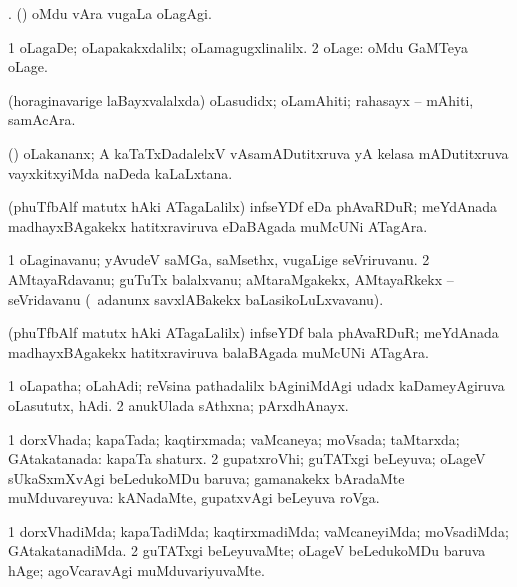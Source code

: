 \noindent
\gl{\pagu}
\bmng
{}. (\AmA) oMdu vAra \mo vugaLa oLagAgi. 
\emng
\eentry

\bentry
{}
\gl{\upa}
\bmng
\bnum
\num{1} oLagaDe; oLapakakxdalilx; oLamagugxlinalilx. 
\num{2} oLage:  oMdu GaMTeya oLage. 
\enum
\emng
\eentry

\bentry
{}
\gl{\nA}
\bmng
(horaginavarige laBayxvalalxda) oLasudidx; oLamAhiti; rahasayx -- mAhiti, samAcAra. 
\emng
\eentry

\bentry
{}
\gl{\nA}
\bmng
(\AmA) oLakananx; A kaTaTxDadalelxV vAsamADutitxruva yA kelasa mADutitxruva vayxkitxyiMda naDeda kaLaLxtana. 
\emng
\eentry

\bentry
{}
\gl{\nA}
\bmng
(phuTfbAlf matutx hAki ATagaLalilx) infseYDf eDa phAvaRDuR; meYdAnada madhayxBAgakekx hatitxraviruva eDaBAgada muMcUNi ATagAra. 
\emng
\eentry

\bentry
{}
\gl{\nA}
\bmng
\bnum
\num{1} oLaginavanu; yAvudeV saMGa, saMsethx, \mo vugaLige seVriruvanu. 
\num{2} AMtayaRdavanu; guTuTx balalxvanu; aMtaraMgakekx, AMtayaRkekx -- seVridavanu (\kanmu\ adanunx savxlABakekx baLasikoLuLxvavanu). 
\enum
\emng
\eentry

\bentry
{}
\gl{\nA}
\bmng
(phuTfbAlf matutx hAki ATagaLalilx) infseYDf bala phAvaRDuR; meYdAnada madhayxBAgakekx hatitxraviruva balaBAgada muMcUNi ATagAra. 
\emng
\eentry

\bentry
{}
\gl{\nA}
\bmng
\bnum
\num{1} oLapatha; oLahAdi; reVsina pathadalilx bAginiMdAgi udadx kaDameyAgiruva oLasututx, hAdi. 
\num{2} anukUlada sAthxna; pArxdhAnayx. 
\enum
\emng
\eentry

\bentry
{}
\gl{\gu}
\bmng
\bnum
\num{1} dorxVhada; kapaTada; kaqtirxmada; vaMcaneya; moVsada; taMtarxda; GAtakatanada:  kapaTa shaturx. 
\num{2} gupatxroVhi; guTATxgi beLeyuva; oLageV sUkaSxmXvAgi beLedukoMDu baruva; gamanakekx bAradaMte muMduvareyuva:  kANadaMte, gupatxvAgi beLeyuva roVga. 
\enum
\emng
\eentry

\bentry
{}
\gl{\kirxvi}
\bmng
\bnum
\num{1} dorxVhadiMda; kapaTadiMda; kaqtirxmadiMda; vaMcaneyiMda; moVsadiMda; GAtakatanadiMda. 
\num{2} guTATxgi beLeyuvaMte; oLageV beLedukoMDu baruva hAge; agoVcaravAgi muMduvariyuvaMte. 
\enum
\emng
\eentry


